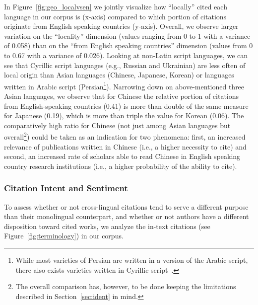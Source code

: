In Figure~\ref{fig:geo_localvsen} we jointly visualize how ``locally'' cited each language in our corpus is (x-axis) compared to which portion of citations originate from English speaking countries (y-axis). Overall, we observe larger variation on the ``locality'' dimension (values ranging from 0 to 1 with a variance of 0.058) than on the ``from English speaking countries'' dimension (values from 0 to 0.67 with a variance of 0.026). Looking at non-Latin script languages, we can see that Cyrillic script languages (e.g., Russian and Ukrainian) are less often of local origin than Asian languages (Chinese, Japanese, Korean) or languages written in Arabic script (Persian\footnote{While most varieties of Persian are written in a version of the Arabic script, there also exists varieties written in Cyrillic script~\cite{Megerdoomian2008}.}). Narrowing down on above-mentioned three Asian languages, we observe that for Chinese the relative portion of citations from English-speaking countries (0.41) is more than double of the same measure for Japanese (0.19), which is more than triple the value for Korean (0.06). The comparatively high ratio for Chinese (not just among Asian languages but overall\footnote{The overall comparison has, however, to be done keeping the limitations described in Section~\ref{sec:ident} in mind.}) could be taken as an indication for two phenomena: first, an increased relevance of publications written in Chinese (i.e., a higher necessity to cite) and second, an increased rate of scholars able to read Chinese in English speaking country research institutions (i.e., a higher probability of the ability to cite).

\subsubsection{Citation Intent and Sentiment}

To assess whether or not cross-lingual citations tend to serve a different purpose than their monolingual counterpart, and whether or not authors have a different disposition toward cited works, we analyze the in-text citations (see Figure~\ref{fig:terminology}) in our corpus.

